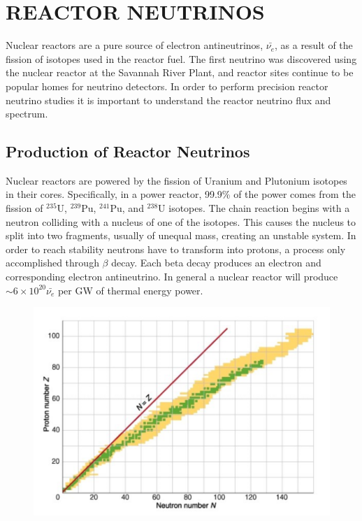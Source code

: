 \chapter{\uppercase{Reactor Neutrinos}}

Nuclear reactors are a pure source of electron antineutrinos, $\bar{\nu_e}$, as a result of the fission of isotopes used in the reactor fuel. The first neutrino was discovered using the nuclear reactor at the Savannah River Plant, and reactor sites continue to be popular homes for neutrino detectors. 
In order to perform precision reactor neutrino studies it is important to understand the reactor neutrino flux and spectrum.

\section{Production of Reactor Neutrinos}

Nuclear reactors are powered by the fission of Uranium and Plutonium isotopes in their cores. 
Specifically, in a power reactor, 99.9\% of the power comes from the fission of $^{235}$U, $^{239}$Pu, $^{241}$Pu, and $^{238}$U isotopes. 
The chain reaction begins with a neutron colliding with a nucleus of one of the isotopes. 
This causes the nucleus to split into two fragments, usually of unequal mass, creating an unstable system.
In order to reach stability neutrons have to transform into protons, a process only accomplished through $\beta$ decay. 
Each beta decay produces an electron and corresponding electron antineutrino. 
In general a nuclear reactor will produce $\sim 6 \times 10^{20} \bar{\nu_e}$ per GW of thermal energy power.

\begin{figure}[h]
	\centering
	\includegraphics[width=0.7\linewidth]{tex/3-reactorneutrinos-images/PLACEHOLDER_NucChart}
	\caption{}
	\label{fig:placeholdernucchart}
\end{figure}


